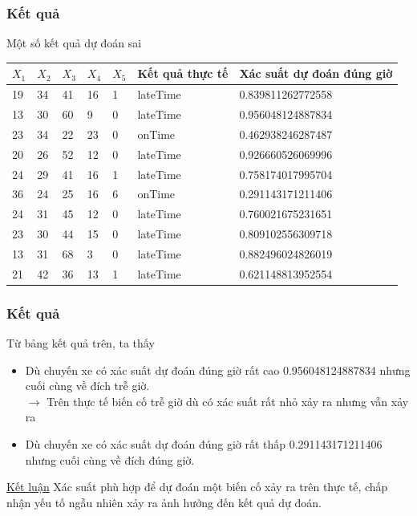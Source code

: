 \documentclass[t]{beamer}
\begin{document}

\begin{frame}
\frametitle{Kết quả}
Một số kết quả dự đoán sai
\begin{flushleft}
\begin{tabular}{|p{0.6cm}|p{0.6cm}|p{0.6cm}|p{0.6cm}|p{0.6cm}|p{1.6cm}|p{5cm}|}
\hline
$X_1$& $X_2$ & $X_3$ & $X_4$ & $X_5$ & Kết quả thực tế & Xác suất dự đoán đúng giờ \\ 
\hline
19 & 34 & 41 & 16 & 1 & lateTime & 0.839811262772558\\
\hline
\rowcolor{LightCyan} 13 & 30 & 60 & 9 & 0 & lateTime & 0.956048124887834\\
\hline
23 & 34 & 22 & 23 & 0 & onTime & 0.462938246287487\\
\hline
20 & 26 & 52 & 12 & 0 & lateTime & 0.926660526069996\\
\hline
24 & 29 & 41 & 16 & 1 & lateTime & 0.758174017995704\\
\hline
\rowcolor{LightCyan} 36 & 24 & 25 & 16 & 6 & onTime & 0.291143171211406\\
\hline
24 & 31 & 45 & 12 & 0 & lateTime & 0.760021675231651\\
\hline
23 & 30 & 44 & 15 & 0 & lateTime & 0.809102556309718\\
\hline
13 & 31 & 68 & 3 & 0 & lateTime & 0.882496024826019\\
\hline
21 & 42 & 36 & 13 & 1 & lateTime & 0.621148813952554\\
\hline
\end{tabular}
\end{flushleft}
\end{frame}

\begin{frame}
\frametitle{Kết quả}
Từ bảng kết quả trên, ta thấy
\begin{itemize}
\item Dù chuyến xe có xác suất dự đoán đúng giờ rất cao 0.956048124887834 nhưng cuối cùng về đích trễ giờ.\\
$\rightarrow$ Trên thực tế biến cố trễ giờ dù có xác suất rất nhỏ xảy ra nhưng vẫn xảy ra 
\item Dù chuyến xe có xác suất dự đoán đúng giờ rất thấp 0.291143171211406 nhưng cuối cùng về đích đúng giờ.
\end{itemize}
\underline{Kết luận} Xác suất phù hợp để dự đoán một biến cố xảy ra trên thực tế, chấp nhận yếu tố ngẫu nhiên xảy ra ảnh hưởng đến kết quả dự đoán.\\
\end{frame}
\end{document}
